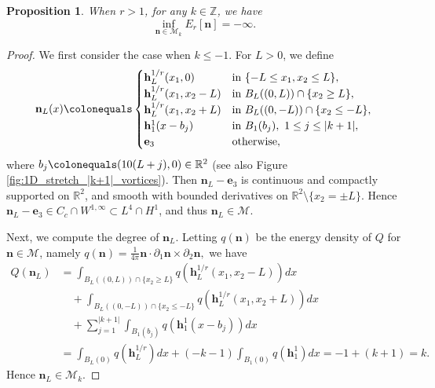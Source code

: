 \documentclass{amsart}
\numberwithin{equation}{section}
\newtheorem{proposition}[theorem]{Proposition}
\theoremstyle{definition}
\theoremstyle{remark}
\newcommand{\R}{\mathbb{R}}
\newcommand{\Z}{\mathbb{Z}}
\newcommand{\n}{\mathbf{n}}
\newcommand{\boM}{\mathcal{M}}
\newcommand{\rd}{{\partial}}								%
\newcommand{\bh}{{\mathbf{h}}}
\newcommand{\bn}{{\mathbf{n}}}
\newcommand{\boe}{{\mathbf{e}}}
\begin{document}
\begin{proposition}\label{P6}
When $r>1$, for any $k\in \Z$, we have
$$
\inf_{\bn\in \boM_k} E_r[\bn] =-\infty.
$$
\end{proposition}
%
%
\begin{proof}
We first consider the case when $k\le -1$. 
For $L>0$, we define
\begin{equation}\label{eq:defnL}
    \bn_L(x) \colonequals 
    \begin{cases}
        \bh_L^{1/r} (x_1,0) &\text{in } 
        \{-L\le x_1,x_2\le L\},\\
        \bh^{1/r}_L (x_1, x_2-L) & \text{in } B_L((0,L))\cap \{x_2\ge L\},\\
        \bh^{1/r}_L (x_1, x_2+L) & \text{in } B_L((0,-L))\cap \{x_2\le -L\},\\
        \bh^{1}_1 (x - b_j) & \text{in } B_1(b_j),\ 1\le j\le |k+1|,\\
        \boe_3 & \text{otherwise},
    \end{cases}
\end{equation}
where $b_j\colonequals (10(L+j),0)\in\R^2$ (see also Figure \ref{fig:1D_stretch_|k+1|_vortices}).
Then $\bn_L-\boe_3$ is continuous and compactly supported on $\R^2$, and smooth with bounded derivatives on $\R^2\setminus\{x_2=\pm L\}$.
Hence $\bn_L-\boe_3\in C_c \cap W^{1,\infty}\subset L^4\cap H^1$, and thus $\bn_L\in \boM$.

Next, we compute the degree of $\bn_L$.
Letting $q(\n)$ be the energy density of $Q$ for $\bn\in\boM$, namely
$
q(\bn)= \frac 1{4\pi} \bn\cdot \rd_1 \bn \times \rd_2 \bn,
$
we have
\begin{align*}
Q(\bn_L) &= 
\int_{B_L((0,L))\cap \{x_2\ge L\}}
q(\bh^{1/r}_{L}(x_1,x_2-L)) dx\\
&\quad +
\int_{B_L((0,-L))\cap \{x_2\le -L\}}
q(\bh^{1/r}_{L}(x_1,x_2+L)) dx\\
&\quad +
\sum_{j=1}^{|k+1|} 
\int_{B_1(b_j)}
q(\bh^{1}_{1}(x-b_j)) dx\\
&=
\int_{B_L(0)} q(\bh^{1/r}_L) dx + (-k-1) 
\int_{B_1(0)} q(\bh^{1}_1) dx = -1+ (k+1) =k.
\end{align*}
Hence $\bn_L\in \boM_{k}$.


\end{proof}
\end{document}
